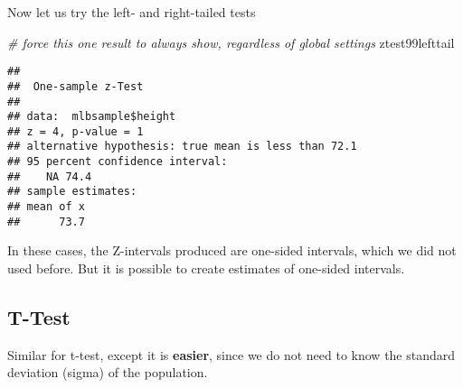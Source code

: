 \documentclass[
]{article}
\newenvironment{Shaded}{\begin{snugshade}}{\end{snugshade}}
\newcommand{\AttributeTok}[1]{\textcolor[rgb]{0.77,0.63,0.00}{#1}}
\newcommand{\CommentTok}[1]{\textcolor[rgb]{0.56,0.35,0.01}{\textit{#1}}}
\newcommand{\FloatTok}[1]{\textcolor[rgb]{0.00,0.00,0.81}{#1}}
\newcommand{\FunctionTok}[1]{\textcolor[rgb]{0.00,0.00,0.00}{#1}}
\newcommand{\NormalTok}[1]{#1}
\newcommand{\OtherTok}[1]{\textcolor[rgb]{0.56,0.35,0.01}{#1}}
\newcommand{\SpecialCharTok}[1]{\textcolor[rgb]{0.00,0.00,0.00}{#1}}
\newcommand{\StringTok}[1]{\textcolor[rgb]{0.31,0.60,0.02}{#1}}
\begin{document}
Now let us try the left- and right-tailed tests

\begin{Shaded}
\end{Shaded}

\begin{Shaded}
\begin{Highlighting}[]
\CommentTok{\# force this one result to always show, regardless of global settings}
\NormalTok{ztest99lefttail}
\end{Highlighting}
\end{Shaded}

\begin{verbatim}
## 
##  One-sample z-Test
## 
## data:  mlbsample$height
## z = 4, p-value = 1
## alternative hypothesis: true mean is less than 72.1
## 95 percent confidence interval:
##    NA 74.4
## sample estimates:
## mean of x 
##      73.7
\end{verbatim}

In these cases, the Z-intervals produced are one-sided intervals, which
we did not used before. But it is possible to create estimates of
one-sided intervals.

\hypertarget{t-test}{%
\subsection{T-Test}\label{t-test}}

Similar for t-test, except it is \textbf{easier}, since we do not need
to know the standard deviation (sigma) of the population.
\end{document}
